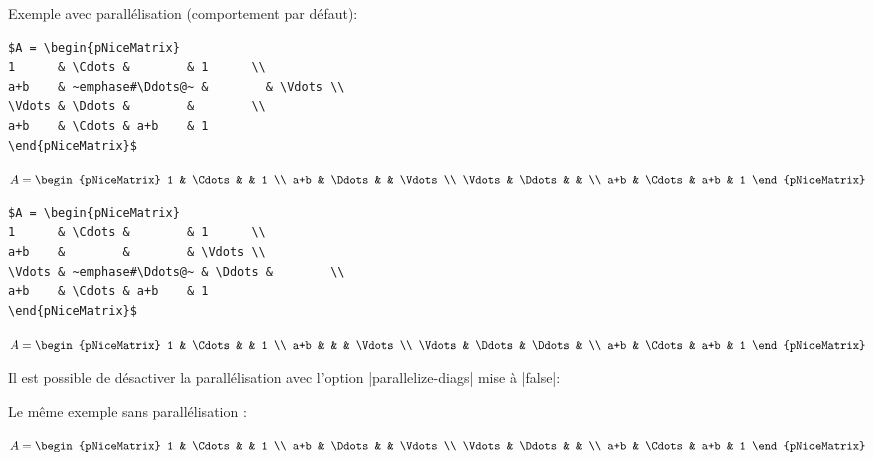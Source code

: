\documentclass[dvipsnames]{article}%
\begin{document}
\medskip
\begin{scope}
\begin{minipage}{9.5cm}
Exemple avec parallélisation (comportement par défaut):
\begin{Verbatim}
$A = \begin{pNiceMatrix}
1      & \Cdots &        & 1      \\
a+b    & ~emphase#\Ddots@~ &        & \Vdots \\
\Vdots & \Ddots &        &        \\
a+b    & \Cdots & a+b    & 1
\end{pNiceMatrix}$
\end{Verbatim}
\end{minipage}
$A = \begin{pNiceMatrix}
1      & \Cdots &     & 1      \\
a+b    & \Ddots &     & \Vdots \\
\Vdots & \Ddots &     &        \\
a+b    & \Cdots & a+b & 1
\end{pNiceMatrix}$

\bigskip
{}%
\begin{minipage}{9.5cm}
\begin{Verbatim}
$A = \begin{pNiceMatrix}
1      & \Cdots &        & 1      \\
a+b    &        &        & \Vdots \\
\Vdots & ~emphase#\Ddots@~ & \Ddots &        \\
a+b    & \Cdots & a+b    & 1
\end{pNiceMatrix}$
\end{Verbatim}
\end{minipage}
$A = \begin{pNiceMatrix}
1      & \Cdots &        & 1      \\
a+b    &        &        & \Vdots \\
\Vdots & \Ddots & \Ddots &        \\
a+b    & \Cdots & a+b    & 1
\end{pNiceMatrix}$

\bigskip
Il est possible de désactiver la parallélisation avec l'option
|parallelize-diags| mise à |false|: \par\nobreak

\medskip
{}%
\begin{minipage}{9.5cm}
Le même exemple sans parallélisation :
\end{minipage}
$A = \begin{pNiceMatrix}
1      & \Cdots  &     & 1      \\
a+b    & \Ddots  &     & \Vdots \\
\Vdots & \Ddots  &     &        \\
a+b    & \Cdots  & a+b & 1
\end{pNiceMatrix}$



\end{scope}
\end{document}

